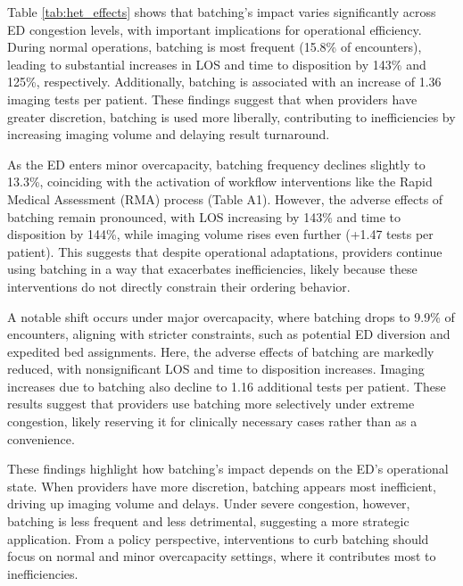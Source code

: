 \documentclass[,,nonblindrev]{informs}
\begin{document}
Table \ref{tab:het_effects} shows that batching's impact varies
significantly across ED congestion levels, with important implications
for operational efficiency. During normal operations, batching is most
frequent (15.8\% of encounters), leading to substantial increases in LOS
and time to disposition by 143\% and 125\%, respectively. Additionally,
batching is associated with an increase of 1.36 imaging tests per
patient. These findings suggest that when providers have greater
discretion, batching is used more liberally, contributing to
inefficiencies by increasing imaging volume and delaying result
turnaround.

As the ED enters minor overcapacity, batching frequency declines
slightly to 13.3\%, coinciding with the activation of workflow
interventions like the Rapid Medical Assessment (RMA) process (Table
A1). However, the adverse effects of batching remain pronounced, with
LOS increasing by 143\% and time to disposition by 144\%, while imaging
volume rises even further (+1.47 tests per patient). This suggests that
despite operational adaptations, providers continue using batching in a
way that exacerbates inefficiencies, likely because these interventions
do not directly constrain their ordering behavior.

A notable shift occurs under major overcapacity, where batching drops to
9.9\% of encounters, aligning with stricter constraints, such as
potential ED diversion and expedited bed assignments. Here, the adverse
effects of batching are markedly reduced, with nonsignificant LOS and
time to disposition increases. Imaging increases due to batching also
decline to 1.16 additional tests per patient. These results suggest that
providers use batching more selectively under extreme congestion, likely
reserving it for clinically necessary cases rather than as a
convenience.

These findings highlight how batching's impact depends on the ED's
operational state. When providers have more discretion, batching appears
most inefficient, driving up imaging volume and delays. Under severe
congestion, however, batching is less frequent and less detrimental,
suggesting a more strategic application. From a policy perspective,
interventions to curb batching should focus on normal and minor
overcapacity settings, where it contributes most to inefficiencies.
\end{document}
